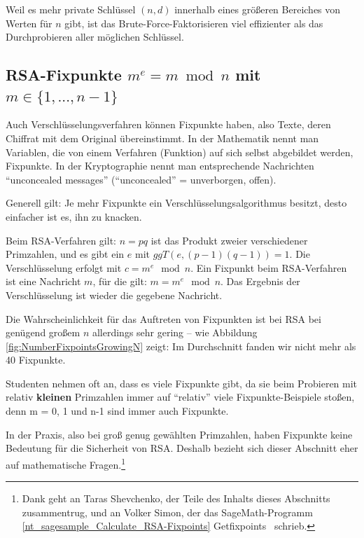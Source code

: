 \begin{refsegment}
\noindent Weil es mehr private Schlüssel $(n, d)$ innerhalb eines größeren
Bereiches von Werten für $n$ gibt, ist das Brute-Force-Faktorisieren
viel effizienter als das Durchprobieren aller möglichen Schlüssel.




\clearpage
\newpage
\hypertarget{NumberTheory_Sage_Number-of-RSA-FixedPoints}{}
\subsection
    [RSA-Fixpunkte \texorpdfstring{}{m = m\^{}e}]%
    {RSA-Fixpunkte $ m^e = m \bmod n $ mit $m \in \{1,...,n-1\}$ }
\label{l:NumberTheory_Sage_Number-of-RSA-FixedPoints}{}

Auch Verschlüsselungsverfahren können Fixpunkte haben, also Texte, deren Chiffrat
mit dem Original übereinstimmt. In der Mathematik nennt man Variablen, die von einem
Verfahren (Funktion) auf sich selbst abgebildet werden, Fixpunkte. In der Kryptographie nennt man entsprechende Nachrichten "`unconcealed messages"' ("`unconcealed"' = unverborgen, offen).

Generell gilt: Je mehr Fixpunkte ein Verschlüsselungsalgorithmus besitzt,
desto einfacher ist es, ihn zu knacken.

Beim RSA-Verfahren gilt: $n=pq$ ist das Produkt zweier verschiedener Primzahlen, und
es gibt ein $e$ mit $ggT(e,(p-1)(q-1))=1$. Die Verschlüsselung erfolgt mit
$c = m^e \mod n$.
Ein Fixpunkt beim RSA-Verfahren ist eine Nachricht $m$, für die gilt:
$m = m^e \mod n$. Das Ergebnis der Verschlüsselung ist wieder die gegebene
Nachricht.

Die Wahrscheinlichkeit für das Auftreten von Fixpunkten ist bei RSA bei genügend
großem $n$ allerdings sehr gering -- wie Abbildung \ref{fig:NumberFixpointsGrowingN}
zeigt: Im Durchschnitt fanden wir nicht mehr als 40 Fixpunkte.

Studenten nehmen oft an, dass es viele Fixpunkte gibt, da sie beim Probieren mit
relativ \textbf{kleinen} Primzahlen immer auf "`relativ"' viele Fixpunkte-Beispiele
stoßen, denn m = 0, 1 und n-1 sind immer auch Fixpunkte.

In der Praxis, also bei groß genug gewählten Primzahlen, haben Fixpunkte keine
Bedeutung für die Sicherheit von RSA. Deshalb bezieht sich dieser Abschnitt
eher auf mathematische Fragen.\footnote{%
Dank geht an Taras Shevchenko, der Teile des Inhalts dieses Abschnitts zusammentrug, und an Volker Simon, der das SageMath-Programm \ref{nt_sagesample_Calculate_RSA-Fixpoints}
\glqq Getfixpoints\grqq~%
schrieb.}



\end{refsegment}
